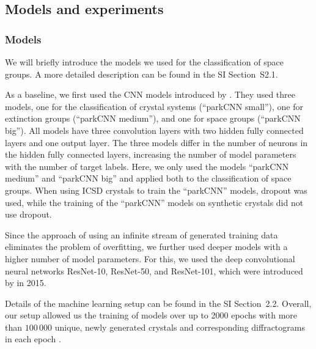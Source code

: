     \subsection{Models and  experiments} \label{sec:models_and_experiments}

    \subsubsection*{Models}
    We will briefly introduce the models we used for the classification
    of space groups. A more detailed description can be found in the SI
    Section~S2.1.

    As a baseline, we first used the CNN models introduced by
    \citeauthor{parkClassificationCrystalStructure2017}\supercite{parkClassificationCrystalStructure2017}.
    They used three models, one for the classification of crystal systems
    (``parkCNN small''), one for extinction groups (``parkCNN medium''), and one
    for space groups (``parkCNN big''). All models have three convolution layers
    with two hidden fully connected layers and one output layer. The
    three models differ in the number of neurons in the hidden fully connected
    layers, increasing the number of model parameters with the number of target
    labels. Here, we only used the models ``parkCNN medium'' and ``parkCNN big''
    and applied both to the classification of space groups. When using ICSD
    crystals to train the ``parkCNN'' models, dropout was used, while the
    training of the ``parkCNN'' models on synthetic crystals did not use
    dropout.

    Since the approach of using an infinite stream of generated training data
    eliminates the problem of overfitting, we further used deeper models with a
    higher number of model parameters. For this, we used the deep convolutional
    neural networks ResNet-10, ResNet-50, and ResNet-101, which were introduced
    by
    \citeauthor{heDeepResidualLearning2016}\supercite{heDeepResidualLearning2016}
    in 2015.

    Details of the machine learning setup can be found in the SI Section~2.2. Overall, our setup allowed us the training of models over up to 2000 epochs with more than $100\,000$ unique, newly generated crystals and corresponding diffractograms in each epoch .

    \subsubsection*{}

